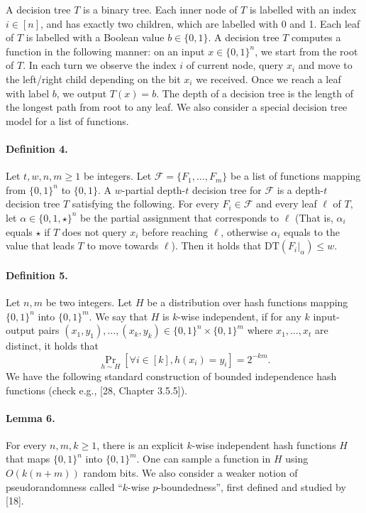 A decision tree $T$ is a binary tree. Each inner node of $T$ is labelled with an index $i\in[n]$, and has exactly two children, which are labelled with 0 and 1. Each leaf of $T$ is labelled with a Boolean value $b\in\{0,1\}$. A decision tree $T$ computes a function in the following manner: on an input $x\in\{0,1\}^n$, we start from the root of $T$. In each turn we observe the index $i$ of current node, query $x_i$ and move to the left/right child depending on the bit $x_i$ we received. Once we reach a leaf with label $b$, we output $T(x)=b$. The depth of a decision tree is the length of the longest path from root to any leaf. We also consider a special decision tree model for a list of functions.
\paragraph{Definition 4.} Let $t,w,n,m\ge1$ be integers. Let $\mathcal F=\{F_1,\ldots,F_m\}$ be a list of functions mapping from $\{0,1\}^n$ to $\{0,1\}$. A $w$-partial depth-$t$ decision tree for $\mathcal F$ is a depth-$t$ decision tree $T$ satisfying the following. For every $F_i\in\mathcal F$ and every leaf $\ell$ of $T$, let $\alpha\in\{0,1,\star\}^n$ be the partial assignment that corresponds to $\ell$ (That is, $\alpha_i$ equals $\star$ if $T$ does not query $x_i$ before reaching $\ell$, otherwise $\alpha_i$ equals to the value that leads $T$ to move towards $\ell$). Then it holds that $\mathrm{DT}(F_i|_\alpha)\le w$.
\paragraph{Definition 5.} Let $n,m$ be two integers. Let $H$ be a distribution over hash functions mapping $\{0,1\}^n$ into $\{0,1\}^m$. We say that $H$ is $k$-wise independent, if for any $k$ input-output pairs $(x_1,y_1),\ldots,(x_k,y_k)\in\{0,1\}^n\times\{0,1\}^m$ where $x_1,\ldots,x_t$ are distinct, it holds that
\[\Pr_{h\sim H}[\forall i\in[k],h(x_i)=y_i]=2^{-km}.\]
We have the following standard construction of bounded independence hash functions (check e.g., [28, Chapter 3.5.5]).
\paragraph{Lemma 6.} For every $n,m,k\ge1$, there is an explicit $k$-wise independent hash functions $H$ that maps $\{0,1\}^n$ into $\{0,1\}^m$. One can sample a function in $H$ using $O(k(n+m))$ random bits.
We also consider a weaker notion of pseudorandomness called ``$k$-wise $p$-boundedness'', first defined and studied by [18].
